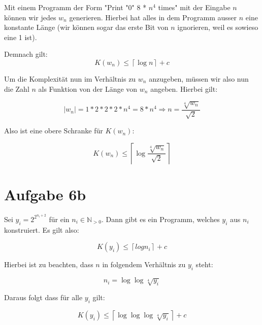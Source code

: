 \documentclass[a4paper]{article}
\begin{document}
	Mit einem Programm der Form "Print "0" 8 * $n^4$ times" mit der Eingabe $n$ können wir jedes $w_n$ generieren.
	Hierbei hat alles in dem Programm ausser $n$ eine konstante Länge (wir können sogar das erste Bit von $n$ ignorieren, weil es sowieso eine 1 ist).

	Demnach gilt:
	\[K(w_n) \leq \left \lceil{\log{n}}\right \rceil + c \]

	Um die Komplexität nun im Verhältnis zu $w_n$ anzugeben, müssen wir also nun die Zahl $n$ als Funktion von der Länge von $w_n$ angeben.
	Hierbei gilt:

	\[\lvert w_n \rvert = 1 * 2 * 2 * 2 * n^4 = 8 * n^4 \Rightarrow n = \frac{\sqrt[4]{w_n}}{\sqrt{2}}\]

	Also ist eine obere Schranke für $K(w_n)$:

	\[K(w_n) \leq \left \lceil{\log{\frac{\sqrt[4]{w_n}}{\sqrt{2}}}}\right \rceil\]

\section{Aufgabe 6b}

	Sei $y_i = 2^{2^{n_{i}+2}}$ für ein $n_i \in \mathbb{N}_{>0}$. Dann gibt es ein Programm, welches $y_i$ aus $n_i$ konstruiert. Es gilt also:

	\[K(y_i) \leq \left \lceil{log{n_i}}\right \rceil + c \]

	Hierbei ist zu beachten, dass $n$ in folgendem Verhältnis zu $y_i$ steht:
	
	\[n_{i} = \log\log\sqrt[4]{y_i} \]

	Daraus folgt dass für alle $y_i$ gilt:

	\[K(y_i) \leq \left \lceil{\log\log\log\sqrt[4]{y_i}}\right \rceil + c \]
	 
\end{document}
